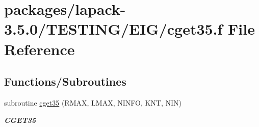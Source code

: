 \hypertarget{cget35_8f}{}\section{packages/lapack-\/3.5.0/\+T\+E\+S\+T\+I\+N\+G/\+E\+I\+G/cget35.f File Reference}
\label{cget35_8f}
\subsection*{Functions/\+Subroutines}
\begin{DoxyCompactItemize}
\item 
subroutine \hyperlink{group__complex__eig_ga749fac66036c4311ca3a1fc5f29bc4ad}{cget35} (R\+M\+A\+X, L\+M\+A\+X, N\+I\+N\+F\+O, K\+N\+T, N\+I\+N)
\begin{DoxyCompactList}\small\item\em {\bfseries C\+G\+E\+T35} \end{DoxyCompactList}\end{DoxyCompactItemize}
